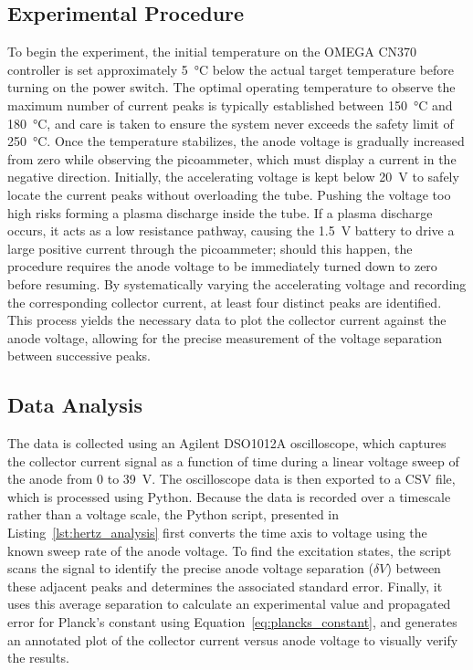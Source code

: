 \documentclass[11pt]{article}
\begin{document}
    \subsection*{Experimental Procedure}
    To begin the experiment, the initial temperature on the OMEGA CN370
    controller is set approximately \SI{5}{\degreeCelsius} below the actual
    target temperature before turning on the power switch.
    The optimal operating temperature to observe the maximum number of current
    peaks is typically established between \SI{150}{\degreeCelsius} and
    \SI{180}{\degreeCelsius}, and care is taken to ensure the system never
    exceeds the safety limit of \SI{250}{\degreeCelsius}.
    Once the temperature stabilizes, the anode voltage is gradually increased
    from zero while observing the picoammeter, which must display a current in
    the negative direction.
    Initially, the accelerating voltage is kept below \SI{20}{\volt} to safely
    locate the current peaks without overloading the tube.
    Pushing the voltage too high risks forming a plasma discharge inside the
    tube.
    If a plasma discharge occurs, it acts as a low resistance pathway, causing
    the \SI{1.5}{\volt} battery to drive a large positive current through the
    picoammeter; should this happen, the procedure requires the anode voltage
    to be immediately turned down to zero before resuming.
    By systematically varying the accelerating voltage and recording the
    corresponding collector current, at least four distinct peaks are
    identified.
    This process yields the necessary data to plot the collector current
    against the anode voltage, allowing for the precise measurement of the
    voltage separation between successive peaks.

    \subsection*{Data Analysis}
    The data is collected using an Agilent DSO1012A oscilloscope, which
    captures the collector current signal as a function of time during a
    linear voltage sweep of the anode from 0 to \SI{39}{\volt}.
    The oscilloscope data is then exported to a CSV file, which is processed
    using Python.
    Because the data is recorded over a timescale rather than a voltage
    scale, the Python script, presented in Listing~\ref{lst:hertz_analysis}
    first converts the time axis to voltage using the known sweep rate of the
    anode voltage.
    To find the excitation states, the script scans the signal to identify
    the precise anode voltage separation (\( \delta V \)) between these
    adjacent peaks and determines the associated standard error.
    Finally, it uses this average separation to calculate an experimental
    value and propagated error for Planck's constant using
    Equation~\ref{eq:plancks_constant}, and generates an annotated plot of the
    collector current versus anode voltage to visually verify the results.
\end{document}
